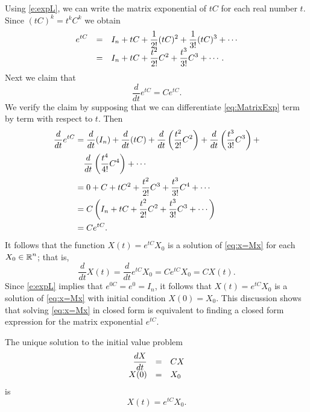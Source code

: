 \documentclass{ximera}
\begin{document}
Using \eqref{e:expL}, we can write the matrix exponential of $tC$
for each real number $t$.  Since $(tC)^k = t^k C^k$ we obtain
\arraystart
\begin{equation}  \label{eq:MatrixExp}
\begin{array}{rcl}
\displaystyle e^{tC} & = & \displaystyle I_n + tC + \frac{1}{2!} (tC)^2 + \frac{1}{3!} (tC)^3
+\cdots\\
\displaystyle & = & \displaystyle I_n + tC + \frac{t^2}{2!} C^2 + \frac{t^3}{3!} C^3 +\cdots.
\end{array}
\end{equation}
\arrayfinish
Next we claim that
\begin{equation}  \label {e:diffmatexp}
  \frac{d}{dt} e^{tC} = Ce^{tC}.
\end{equation}
We verify the claim by supposing that we can differentiate
\eqref{eq:MatrixExp} term by term with respect to $t$. Then
\begin{align*}
  \displaystyle\frac{d}{dt} e^{tC} & = \frac{d}{dt}(I_n) + \frac{d}{dt}(tC)
  + \frac{d}{dt}\left(\frac{t^2}{2!} C^2\right) + 
                            \frac{d}{dt}\left(\frac{t^3}{3!} C^3\right) + \\
                          &\quad
  \frac{d}{dt}\left(\frac{t^4}{4!}C^4\right) + \cdots\\
     & = 0 + C + t C^2 + \frac{t^2}{2!} C^3 +
\frac{t^3}{3!} C^4 + \cdots\\
     & = C\left(I_n + tC + \frac{t^2}{2!} C^2 + \frac{t^3}{3!} C^3
+\cdots\right)\\
     & = Ce^{tC}.
\end{align*}
It follows that the function $X(t) = e^{tC}X_0$ is a solution of
\eqref{eq:x=Mx} for each $X_0\in\mbox{$\Bbb{R}$}^n$; that is,
\[
     \frac{d}{dt} X(t) =  \frac{d}{dt}  e^{tC}X_0
     = C e^{tC}X_0 = C X(t).
\]
Since \eqref{e:expL} implies that $e^{0C} = e^0 = I_n$, it follows
that $X(t) = e^{tC}X_0$ is a solution of \eqref{eq:x=Mx} with
initial condition $X(0)=X_0$.  This discussion shows that solving
\eqref{eq:x=Mx} in closed form is equivalent to finding a closed
form expression for the matrix exponential $e^{tC}$.

\begin{theorem}  \label{T:linODEsoln}
The unique solution to the
initial value problem
\arraystart
\[
\begin{array}{rcl}
\displaystyle\frac{dX}{dt} & = & CX \\
X(0) & = & X_0
\end{array}
\]
\arrayfinish
is
\[
X(t)=e^{tC}X_0.
\]
\end{theorem}
\end{document}
